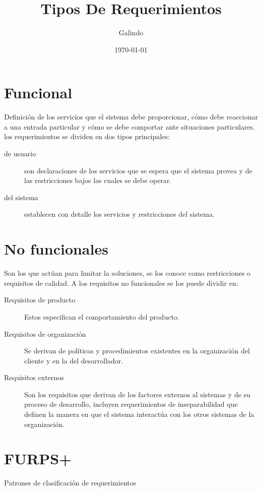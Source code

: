 \documentclass[11pt]{article}
\author{Galindo}
\date{\today}
\title{Tipos De Requerimientos}
\begin{document}
\maketitle
\tableofcontents


\section{Funcional}
\label{sec:org4b417dd}
Definición de los servicios que el sistema debe proporcionar, cómo debe reaccionar a una entrada particular y cómo se debe comportar ante situaciones particulares. los requerimientos se dividen en dos tipos principales:

\begin{description}
\item[{de usuario}] son declaraciones de los servicios que se espera que el sistema provea y de las restricciones bajos las cuales se debe operar.

\item[{del sistema}] establecen con detalle los servicios y restricciones del sistema.
\end{description}

\section{No funcionales}
\label{sec:orga9a69e7}
Son los que actúan para limitar la soluciones, se los conoce como restricciones o requisitos de calidad. A los requisitos no funcionales se los puede dividir en:

\begin{description}
\item[{Requisitos de producto}] Estos especifican el comportamiento del producto.

\item[{Requisitos de organización}] Se derivan de políticas y procedimientos existentes en la organización del cliente y en la del desarrollador.

\item[{Requisitos externos}] Son los requisitos que derivan de los factores externos al sistemas y de su proceso de desarrollo, incluyen requerimientos de inseparabilidad que definen la manera en que el sistema interactúa con los otros sistemas de la organización.
\end{description}

\section{FURPS+}
\label{sec:org2a868e4}
Patrones de clasificación de requerimientos
\end{document}
